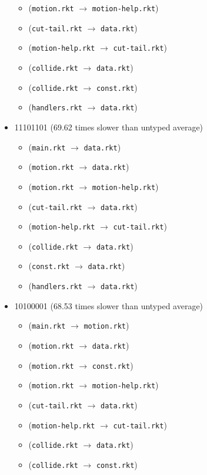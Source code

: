 \documentclass{article}
\newcommand{\mono}[1]{\texttt{#1}}
\begin{document}
\begin{itemize}
\begin{itemize}
  \item (\mono{motion.rkt} $\rightarrow$ \mono{motion-help.rkt})
  \item (\mono{cut-tail.rkt} $\rightarrow$ \mono{data.rkt})
  \item (\mono{motion-help.rkt} $\rightarrow$ \mono{cut-tail.rkt})
  \item (\mono{collide.rkt} $\rightarrow$ \mono{data.rkt})
  \item (\mono{collide.rkt} $\rightarrow$ \mono{const.rkt})
  \item (\mono{handlers.rkt} $\rightarrow$ \mono{data.rkt})
  \end{itemize}
\item 11101101 (69.62 times slower than untyped average)
  \begin{itemize}
  \item (\mono{main.rkt} $\rightarrow$ \mono{data.rkt})
  \item (\mono{motion.rkt} $\rightarrow$ \mono{data.rkt})
  \item (\mono{motion.rkt} $\rightarrow$ \mono{motion-help.rkt})
  \item (\mono{cut-tail.rkt} $\rightarrow$ \mono{data.rkt})
  \item (\mono{motion-help.rkt} $\rightarrow$ \mono{cut-tail.rkt})
  \item (\mono{collide.rkt} $\rightarrow$ \mono{data.rkt})
  \item (\mono{const.rkt} $\rightarrow$ \mono{data.rkt})
  \item (\mono{handlers.rkt} $\rightarrow$ \mono{data.rkt})
  \end{itemize}
\item 10100001 (68.53 times slower than untyped average)
  \begin{itemize}
  \item (\mono{main.rkt} $\rightarrow$ \mono{motion.rkt})
  \item (\mono{motion.rkt} $\rightarrow$ \mono{data.rkt})
  \item (\mono{motion.rkt} $\rightarrow$ \mono{const.rkt})
  \item (\mono{motion.rkt} $\rightarrow$ \mono{motion-help.rkt})
  \item (\mono{cut-tail.rkt} $\rightarrow$ \mono{data.rkt})
  \item (\mono{motion-help.rkt} $\rightarrow$ \mono{cut-tail.rkt})
  \item (\mono{collide.rkt} $\rightarrow$ \mono{data.rkt})
  \item (\mono{collide.rkt} $\rightarrow$ \mono{const.rkt})

\end{itemize}
\end{itemize}
\end{document}
